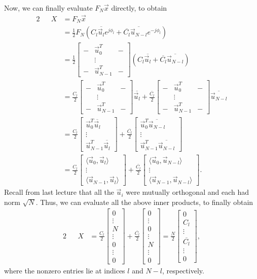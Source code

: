 \documentclass[letterpaper]{article}
\theoremstyle{remark}
\newcommand{\mat}[1]{\ensuremath{\begin{bmatrix}#1\end{bmatrix}}}
\newcommand{\eqn}[1]{\begin{alignat*}{2}#1\end{alignat*}}
\begin{document}
Now, we can finally evaluate $F_N\vec{x}$ directly, to obtain
\eqn{
    && X &= F_N \vec{x} \\
    &&&= \frac{1}{2} F_N (C_l\overline{\vec{u}_l} e^{j\phi_l} + \overline{C_l}\overline{\vec{u}_{N-l}} e^{-j\phi_l}) \\
    &&&= \frac{1}{2} \mat{ - & \vec{u}_0^T & - \\ & \vdots & \\ - & \vec{u}_{N-1}^T & - } (C_l\overline{\vec{u}_l} + \overline{C_l}\overline{\vec{u}_{N-l}}) \\
    &&&= \frac{C_l}{2} \mat{ - & \vec{u}_0^T & - \\ & \vdots & \\ - & \vec{u}_{N-1}^T & - } \overline{\vec{u}_l} + \frac{\overline{C_l}}{2} \mat{ - & \vec{u}_0^T & - \\ & \vdots & \\ - & \vec{u}_{N-1}^T & - } \overline{\vec{u}_{N-l}} \\
    &&&= \frac{C_l}{2} \mat{ \vec{u}_0^T\overline{\vec{u}_l} \\ \vdots \\ \vec{u}_{N-1}^T\overline{\vec{u}_l}} + \frac{\overline{C_l}}{2} \mat{ \vec{u}_0^T\overline{\vec{u}_{N - l}} \\ \vdots \\ \vec{u}_{N-1}^T\overline{\vec{u}_{N - l}}} \\
    &&&= \frac{C_l}{2} \mat{\langle \vec{u}_0, \vec{u}_l \rangle \\ \vdots \\ \langle \vec{u}_{N-1}, \vec{u}_l \rangle} + \frac{\overline{C_l}}{2} \mat{\langle \vec{u}_0, \vec{u}_{N-l} \rangle \\ \vdots \\ \langle \vec{u}_{N-1}, \vec{u}_{N-l} \rangle}.
}
Recall from last lecture that all the $\vec{u}_i$ were mutually orthogonal and each had norm $\sqrt{N}$. Thus, we can evaluate all the above inner products, to finally obtain
\eqn{
    && X &= \frac{C_l}{2} \mat{0 \\ \vdots \\ N \\ \vdots \\ 0 \\ \vdots \\ 0} + \frac{\overline{C_l}}{2} \mat{0 \\ \vdots \\ 0 \\ \vdots \\ N \\ \vdots \\ 0} = \frac{N}{2} \mat{0 \\ C_l \\ \vdots \\ \overline{C_l} \\ \vdots \\ 0},
}
where the nonzero entries lie at indices $l$ and $N - l$, respectively.
\end{document}
